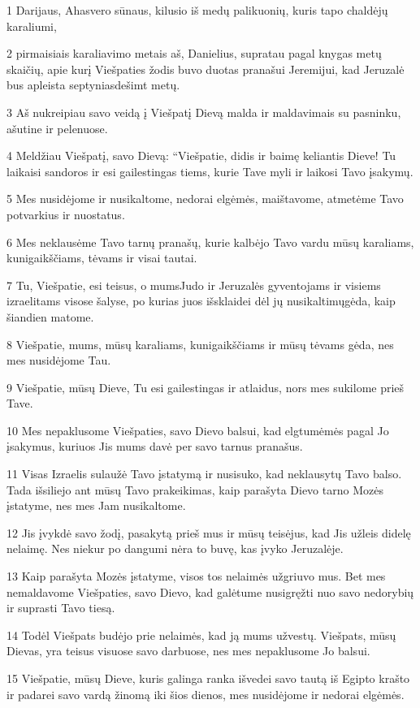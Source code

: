 \par 1 Darijaus, Ahasvero sūnaus, kilusio iš medų palikuonių, kuris tapo chaldėjų karaliumi, 
\par 2 pirmaisiais karaliavimo metais aš, Danielius, supratau pagal knygas metų skaičių, apie kurį Viešpaties žodis buvo duotas pranašui Jeremijui, kad Jeruzalė bus apleista septyniasdešimt metų. 
\par 3 Aš nukreipiau savo veidą į Viešpatį Dievą malda ir maldavimais su pasninku, ašutine ir pelenuose. 
\par 4 Meldžiau Viešpatį, savo Dievą: “Viešpatie, didis ir baimę keliantis Dieve! Tu laikaisi sandoros ir esi gailestingas tiems, kurie Tave myli ir laikosi Tavo įsakymų. 
\par 5 Mes nusidėjome ir nusikaltome, nedorai elgėmės, maištavome, atmetėme Tavo potvarkius ir nuostatus. 
\par 6 Mes neklausėme Tavo tarnų pranašų, kurie kalbėjo Tavo vardu mūsų karaliams, kunigaikščiams, tėvams ir visai tautai. 
\par 7 Tu, Viešpatie, esi teisus, o mums­Judo ir Jeruzalės gyventojams ir visiems izraelitams visose šalyse, po kurias juos išsklaidei dėl jų nusikaltimų­gėda, kaip šiandien matome. 
\par 8 Viešpatie, mums, mūsų karaliams, kunigaikščiams ir mūsų tėvams gėda, nes mes nusidėjome Tau. 
\par 9 Viešpatie, mūsų Dieve, Tu esi gailestingas ir atlaidus, nors mes sukilome prieš Tave. 
\par 10 Mes nepaklusome Viešpaties, savo Dievo balsui, kad elgtumėmės pagal Jo įsakymus, kuriuos Jis mums davė per savo tarnus pranašus. 
\par 11 Visas Izraelis sulaužė Tavo įstatymą ir nusisuko, kad neklausytų Tavo balso. Tada išsiliejo ant mūsų Tavo prakeikimas, kaip parašyta Dievo tarno Mozės įstatyme, nes mes Jam nusikaltome. 
\par 12 Jis įvykdė savo žodį, pasakytą prieš mus ir mūsų teisėjus, kad Jis užleis didelę nelaimę. Nes niekur po dangumi nėra to buvę, kas įvyko Jeruzalėje. 
\par 13 Kaip parašyta Mozės įstatyme, visos tos nelaimės užgriuvo mus. Bet mes nemaldavome Viešpaties, savo Dievo, kad galėtume nusigręžti nuo savo nedorybių ir suprasti Tavo tiesą. 
\par 14 Todėl Viešpats budėjo prie nelaimės, kad ją mums užvestų. Viešpats, mūsų Dievas, yra teisus visuose savo darbuose, nes mes nepaklusome Jo balsui. 
\par 15 Viešpatie, mūsų Dieve, kuris galinga ranka išvedei savo tautą iš Egipto krašto ir padarei savo vardą žinomą iki šios dienos, mes nusidėjome ir nedorai elgėmės. 
